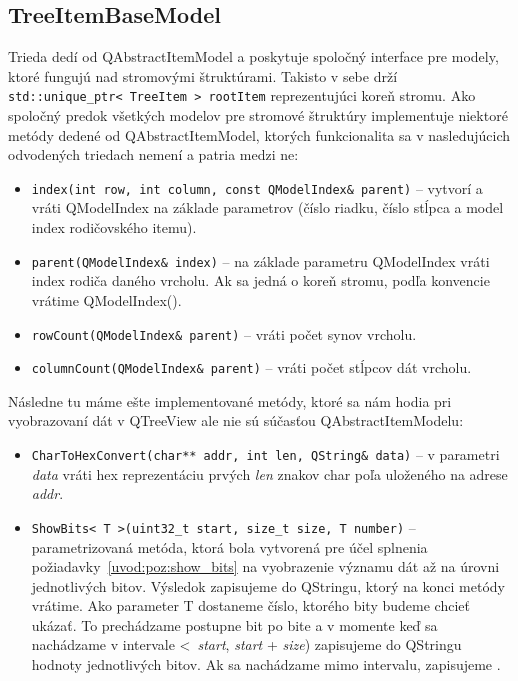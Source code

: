 \subsection{TreeItemBaseModel}
Trieda dedí od QAbstractItemModel a poskytuje spoločný interface pre modely, ktoré fungujú nad stromovými štruktúrami. Takisto v sebe drží \newline\texttt{std::unique\_ptr\textless~TreeItem~\textgreater~rootItem} reprezentujúci koreň stromu. Ako \newline spoločný predok všetkých modelov pre stromové štruktúry implementuje niektoré metódy dedené od QAbstractItemModel, ktorých funkcionalita sa v nasledujúcich odvodených triedach nemení a patria medzi ne:
\begin{itemize}
\item \texttt{index(int row, int column, const QModelIndex\& parent)} -- vytvorí \newline a vráti QModelIndex na základe parametrov (číslo riad\-ku, číslo stĺpca a model index rodičovského itemu).
\item \texttt{parent(QModelIndex\& index)} -- na základe parametru QModelIndex vráti index rodiča daného vrcholu. Ak sa jedná o koreň stromu, podľa konvencie vrátime QModelIndex().
\item \texttt{rowCount(QModelIndex\& parent)} -- vráti počet synov vrcholu.
\item \texttt{columnCount(QModelIndex\& parent)} -- vráti počet stĺpcov dát vrcholu.
\end{itemize}
 
Následne tu máme ešte implementované metódy, ktoré sa nám hodia pri vyobrazovaní dát v QTreeView ale nie sú súčasťou QAbstractItemModelu:
\begin{itemize}
\item \texttt{CharToHexConvert(char** addr, int len, QString\& data)} -- v parametri \textit{data} vráti hex reprezentáciu prvých \textit{len} znakov char poľa uloženého na adrese \textit{addr}.
\item \texttt{ShowBits\textless~T~\textgreater(uint32\_t start, size\_t size, T number)}  -- parametrizovaná metóda, ktorá bola vytvorená pre účel splnenia požiadavky~\ref{uvod:poz:show_bits} na vyobrazenie významu dát až na úrovni jednotlivých bitov. Výsledok zapisujeme do QStringu, ktorý na konci metódy vrátime. Ako parameter T dostaneme číslo, ktorého bity budeme chcieť ukázať. To prechádzame postupne bit po bite a v momente keď sa nachádzame v intervale \textless~\textit{start}, \textit{start} + \textit{size}) zapisujeme do QStringu hodnoty jednotlivých bitov. Ak sa nachádzame mimo intervalu, zapisujeme .
\end{itemize}

